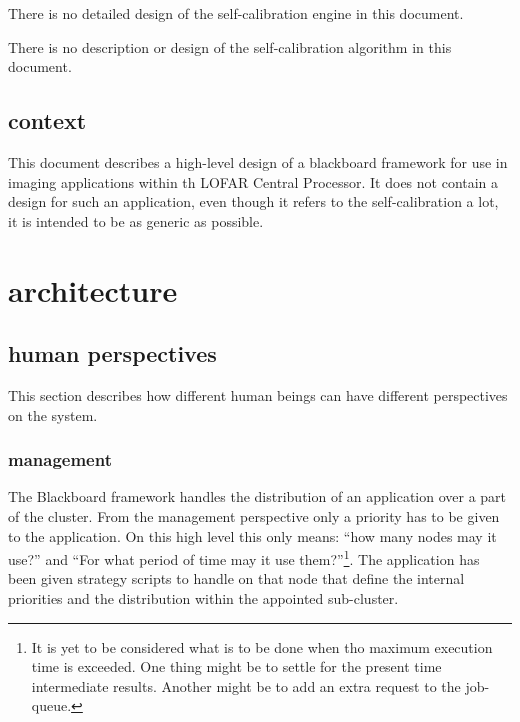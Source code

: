 \documentclass[]{lofar}
\begin{document}
        There is no detailed design of the self-calibration engine in
        this document.

        There is no description or design of the self-calibration
        algorithm in this document.

    \subsection{context}
    \label{subsec:context}\hypertarget{subsec:context}{}

      This document describes a high-level design of a blackboard
      framework for use in imaging applications within th LOFAR Central
      Processor. It does not contain a design for such an application,
      even though it refers to the self-calibration a lot, it is
      intended to be as generic as possible.

  \section{architecture}
  \label{sec:architecture}\hypertarget{sec:architecture}{}

    \subsection{human perspectives}

      This section describes how different human beings can have
      different perspectives on the system.

      \subsubsection{management}

        The Blackboard framework handles the distribution of an
        application over a part of the cluster. From the management
        perspective only a priority has to be given to the
        application. On this high level this only means: ``how many
        nodes may it use?'' and ``For what period of time may it use
        them?''\footnote{It is yet to be considered what is to be done
        when tho maximum execution time is exceeded. One thing might
        be to settle for the present time intermediate
        results. Another might be to add an extra request to the
        job-queue.\label{execution-duration}}. The application has been
        given strategy scripts to handle on that node that define the
        internal priorities and the distribution within the appointed
        sub-cluster.
\end{document}
